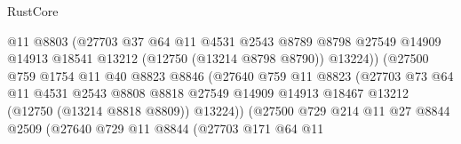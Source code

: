 \begin{lexlean}{RustCore}
\begin{coremodule}
                                    @11
                                    @8803
                                    (@27703
                                      @37
                                      @64
                                      @11
                                      @4531
                                      @2543
                                      @8789
                                      @8798
                                      @27549
                                      @14909
                                      @14913
                                      @18541
                                      @13212
                                      (@12750 (@13214 @8798 @8790))
                                      @13224))
                                  (@27500
                                    @759
                                    @1754
                                    @11
                                    @40
                                    @8823
                                    @8846
                                    (@27640
                                      @759
                                      @11
                                      @8823
                                      (@27703
                                        @73
                                        @64
                                        @11
                                        @4531
                                        @2543
                                        @8808
                                        @8818
                                        @27549
                                        @14909
                                        @14913
                                        @18467
                                        @13212
                                        (@12750 (@13214 @8818 @8809))
                                        @13224))
                                    (@27500
                                      @729
                                      @214
                                      @11
                                      @27
                                      @8844
                                      @2509
                                      (@27640
                                        @729
                                        @11
                                        @8844
                                        (@27703
                                          @171
                                          @64
                                          @11

\end{coremodule}
\end{lexlean}
